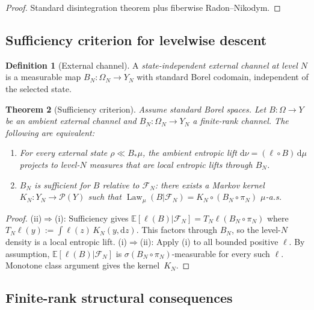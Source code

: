 \documentclass[12pt,a4paper]{article}
\theoremstyle{plain}
\newtheorem{theorem}{Theorem}[section]
\theoremstyle{definition}
\newtheorem{definition}[theorem]{Definition}
\theoremstyle{remark}
\newcommand{\dd}{\mathrm{d}}
\newcommand{\cF}{\mathcal{F}}
\newcommand{\cP}{\mathcal{P}}
\newcommand{\E}{\mathbb{E}}
\newcommand{\Law}{\operatorname{Law}}
\begin{document}
\begin{proof}
Standard disintegration theorem plus fiberwise Radon--Nikodym.
\end{proof}

\subsection{Sufficiency criterion for levelwise descent}

\begin{definition}[External channel]
A \emph{state-independent external channel at level $N$} is a
measurable map $B_N\colon \Omega_N \to Y_N$ with standard Borel
codomain, independent of the selected state.
\end{definition}

\begin{theorem}[Sufficiency criterion]
\label{thm:sufficiency}
Assume standard Borel spaces.  Let $B\colon \Omega \to Y$ be an
ambient external channel and $B_N\colon \Omega_N \to Y_N$ a
finite-rank channel.  The following are equivalent:
\begin{enumerate}[label=\textup{(\roman*)},leftmargin=2.5em]
  \item For every external state $\rho \ll B_*\mu$, the ambient
    entropic lift $\dd\nu = (\ell\circ B)\,\dd\mu$ projects to
    level-$N$ measures that are local entropic lifts through $B_N$.
  \item $B_N$ is sufficient for $B$ relative to $\cF_N$: there
    exists a Markov kernel $K_N\colon Y_N \to \cP(Y)$ such that
    $\Law_\mu(B|\cF_N) = K_N \circ (B_N \circ \pi_N)$
    $\mu$-a.s.
\end{enumerate}
\end{theorem}

\begin{proof}
(ii)$\Rightarrow$(i): Sufficiency gives
$\E[\ell(B)|\cF_N] = T_N\ell(B_N\circ\pi_N)$ where
$T_N\ell(y) := \int\ell(z)\,K_N(y,\dd z)$.  This factors through
$B_N$, so the level-$N$ density is a local entropic lift.
(i)$\Rightarrow$(ii): Apply (i) to all bounded positive $\ell$.
By assumption, $\E[\ell(B)|\cF_N]$ is $\sigma(B_N\circ\pi_N)$-measurable
for every such $\ell$.  Monotone class argument gives the kernel~$K_N$.
\end{proof}

\subsection{Finite-rank structural consequences}
\end{document}
